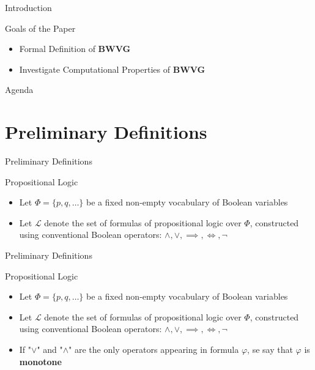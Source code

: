 \documentclass{beamer}
\begin{document}
\begin{frame}[fragile]{Introduction}
  \begin{block}{Goals of the Paper}
    \begin{itemize}
      \item Formal Definition of \textbf{BWVG}
      \item Investigate Computational Properties of \textbf{BWVG}
    \end{itemize}
  \end{block}
\end{frame}

\begin{frame}[fragile]{Agenda}
  \section{Preliminary Definitions}
  \tableofcontents[currentsection]
\end{frame}

\begin{frame}[fragile]{Preliminary Definitions}
  \begin{block}{Propositional Logic}
    \begin{itemize}
      \item Let $\Phi = \{p,q,\dots\}$ be a fixed non-empty vocabulary of Boolean variables    
      \item Let $\mathcal{L}$ denote the set of formulas of propositional logic over $\Phi$, constructed using conventional Boolean operators: 
      $\land, \lor, \implies, \iff, \neg$
    \end{itemize}
  \end{block}
\end{frame}


\begin{frame}[fragile]{Preliminary Definitions}
  \begin{block}{Propositional Logic}
    \begin{itemize}
      \item Let $\Phi = \{p,q,\dots\}$ be a fixed non-empty vocabulary of Boolean variables    
      \item Let $\mathcal{L}$ denote the set of formulas of propositional logic over $\Phi$, constructed using conventional Boolean operators: 
      $\land, \lor, \implies, \iff, \neg$
      \item If "$\lor$" and "$\land$" are the only operators appearing in formula $\varphi$, se say that $\varphi$ is \textbf{monotone}
    \end{itemize}
  \end{block}
\end{frame}
\end{document}
